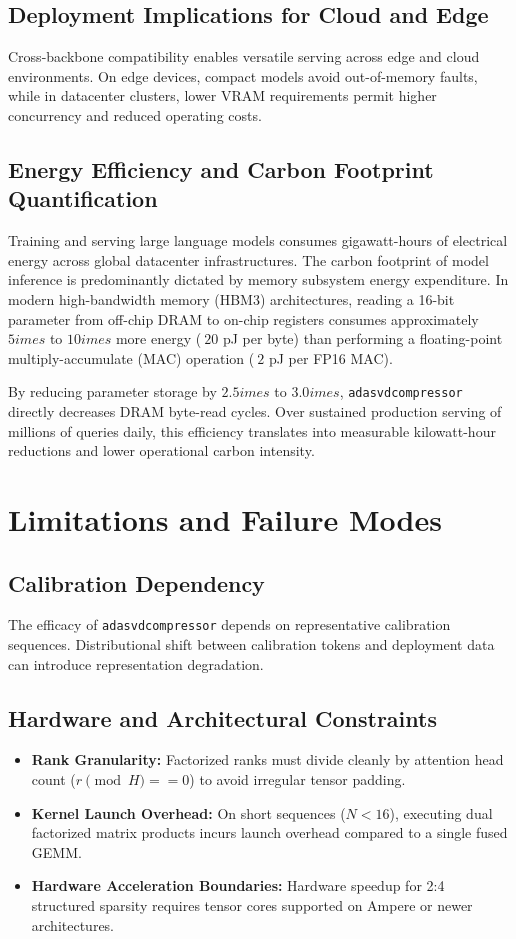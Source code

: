 \documentclass{article}
\begin{document}
\subsection{Deployment Implications for Cloud and Edge}
Cross-backbone compatibility enables versatile serving across edge and cloud environments. On edge devices, compact models avoid out-of-memory faults, while in datacenter clusters, lower VRAM requirements permit higher concurrency and reduced operating costs.

\subsection{Energy Efficiency and Carbon Footprint Quantification}
Training and serving large language models consumes gigawatt-hours of electrical energy across global datacenter infrastructures. The carbon footprint of model inference is predominantly dictated by memory subsystem energy expenditure. In modern high-bandwidth memory (HBM3) architectures, reading a 16-bit parameter from off-chip DRAM to on-chip registers consumes approximately $5	imes$ to $10	imes$ more energy ($~20$ pJ per byte) than performing a floating-point multiply-accumulate (MAC) operation ($~2$ pJ per FP16 MAC).

By reducing parameter storage by $2.5	imes$ to $3.0	imes$, \texttt{adasvdcompressor} directly decreases DRAM byte-read cycles. Over sustained production serving of millions of queries daily, this efficiency translates into measurable kilowatt-hour reductions and lower operational carbon intensity.


\section{Limitations and Failure Modes}

\subsection{Calibration Dependency}
The efficacy of \texttt{adasvdcompressor} depends on representative calibration sequences. Distributional shift between calibration tokens and deployment data can introduce representation degradation.

\subsection{Hardware and Architectural Constraints}
\begin{itemize}
\item \textbf{Rank Granularity:} Factorized ranks must divide cleanly by attention head count ($r \pmod H == 0$) to avoid irregular tensor padding.
\item \textbf{Kernel Launch Overhead:} On short sequences ($N < 16$), executing dual factorized matrix products incurs launch overhead compared to a single fused GEMM.
\item \textbf{Hardware Acceleration Boundaries:} Hardware speedup for 2:4 structured sparsity requires tensor cores supported on Ampere or newer architectures.
\end{itemize}
\end{document}
